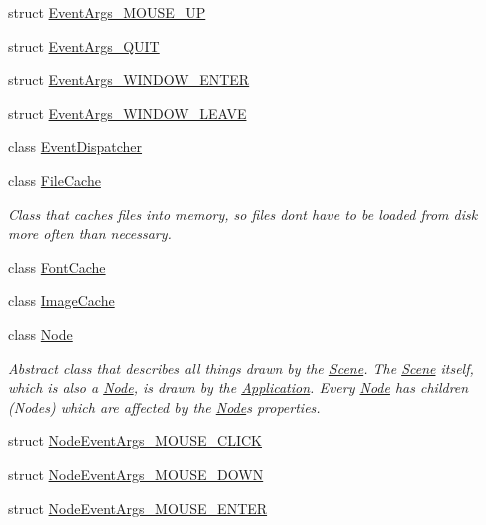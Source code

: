 \begin{DoxyCompactItemize}
struct \mbox{\hyperlink{structsage_1_1EventArgs__MOUSE__UP}{Event\+Args\+\_\+\+M\+O\+U\+S\+E\+\_\+\+UP}}
\item 
struct \mbox{\hyperlink{structsage_1_1EventArgs__QUIT}{Event\+Args\+\_\+\+Q\+U\+IT}}
\item 
struct \mbox{\hyperlink{structsage_1_1EventArgs__WINDOW__ENTER}{Event\+Args\+\_\+\+W\+I\+N\+D\+O\+W\+\_\+\+E\+N\+T\+ER}}
\item 
struct \mbox{\hyperlink{structsage_1_1EventArgs__WINDOW__LEAVE}{Event\+Args\+\_\+\+W\+I\+N\+D\+O\+W\+\_\+\+L\+E\+A\+VE}}
\item 
class \mbox{\hyperlink{classsage_1_1EventDispatcher}{Event\+Dispatcher}}
\item 
class \mbox{\hyperlink{classsage_1_1FileCache}{File\+Cache}}
\begin{DoxyCompactList}\small\item\em Class that caches files into memory, so files don\textquotesingle{}t have to be loaded from disk more often than necessary. \end{DoxyCompactList}\item 
class \mbox{\hyperlink{classsage_1_1FontCache}{Font\+Cache}}
\item 
class \mbox{\hyperlink{classsage_1_1ImageCache}{Image\+Cache}}
\item 
class \mbox{\hyperlink{classsage_1_1Node}{Node}}
\begin{DoxyCompactList}\small\item\em Abstract class that describes all things drawn by the \mbox{\hyperlink{classsage_1_1Scene}{Scene}}. The \mbox{\hyperlink{classsage_1_1Scene}{Scene}} itself, which is also a \mbox{\hyperlink{classsage_1_1Node}{Node}}, is drawn by the \mbox{\hyperlink{classsage_1_1Application}{Application}}. Every \mbox{\hyperlink{classsage_1_1Node}{Node}} has children (Nodes) which are affected by the \mbox{\hyperlink{classsage_1_1Node}{Node}}\textquotesingle{}s properties. \end{DoxyCompactList}\item 
struct \mbox{\hyperlink{structsage_1_1NodeEventArgs__MOUSE__CLICK}{Node\+Event\+Args\+\_\+\+M\+O\+U\+S\+E\+\_\+\+C\+L\+I\+CK}}
\item 
struct \mbox{\hyperlink{structsage_1_1NodeEventArgs__MOUSE__DOWN}{Node\+Event\+Args\+\_\+\+M\+O\+U\+S\+E\+\_\+\+D\+O\+WN}}
\item 
struct \mbox{\hyperlink{structsage_1_1NodeEventArgs__MOUSE__ENTER}{Node\+Event\+Args\+\_\+\+M\+O\+U\+S\+E\+\_\+\+E\+N\+T\+ER}}
\item 

\end{DoxyCompactItemize}
